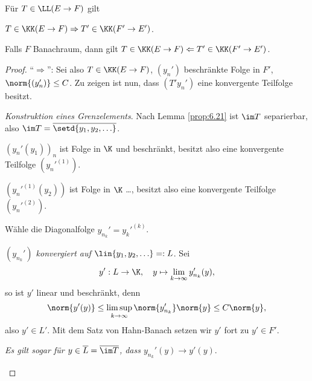 \begin{prop}
\label{prop:6.22}
Für $T\in \LL(E\to F)$ gilt
\begin{propenum}
\item $T\in \KK(E\to F) \Rightarrow T'\in \KK(F'\to E')$.
\item Falls $F$ Banachraum, dann gilt $T\in \KK(E\to F) \Leftarrow T'\in
\KK(F'\to E')$.\fishhere
\end{propenum}
\end{prop}
\begin{proof}
``$\Rightarrow$'': Sei also $T\in\KK(E\to F)$, $(y_n')$ beschränkte Folge in
$F'$, $\norm{(y_n')} \le C$. Zu zeigen ist nun, dass $(T'y_n')$ eine konvergente
Teilfolge besitzt.
\begin{proofenum}
  \item \textit{Konstruktion eines Grenzelements}. Nach Lemma \ref{prop:6.21}
  ist $\im T$ separierbar, also $\im T = \overline{\setd{y_1,y_2,\ldots}}$.

$(y_n'(y_1))_n$ ist Folge in $\K$ und beschränkt, besitzt also eine konvergente
Teilfolge $(y_n'^{(1)})$.

$(y_n'^{(1)}(y_2))$ ist Folge in $\K$ \ldots, besitzt also eine konvergente
Teilfolge $(y_n'^{(2)})$.

Wähle die Diagonalfolge $y_{n_k}' = y_k'^{(k)}$.

\item \textit{$(y_{n_k}')$ konvergiert auf $\lin{y_1,y_2,\ldots}=:L$}. Sei 
\begin{align*}
y' : L\to \K,\quad y\mapsto \lim\limits_{k\to\infty} y_{n_k}'(y),
\end{align*}
so ist $y'$ linear und beschränkt, denn
\begin{align*}
\norm{y'(y)} \le \limsup\limits_{k\to\infty} \norm{y_{n_k}'}\norm{y} \le
C\norm{y},
\end{align*}
also $y'\in L'$. Mit dem Satz von Hahn-Banach setzen wir $y'$ fort zu $y'\in
F'$.
\item \textit{Es gilt sogar für $y\in \overline{L} = \overline{\im T}$, dass
$y_{n_k}'(y) \to y'(y)$}.


\end{proofenum}
\end{proof}
